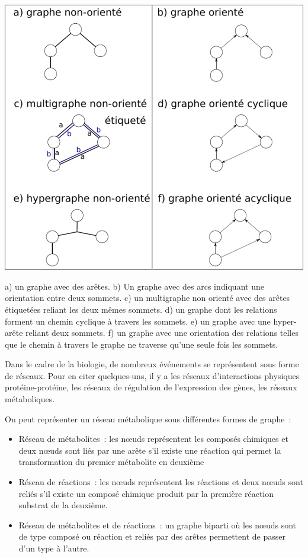 \begin{refsegment}
    
    \begin{shadedfigure}[H]
    	\centering
    	\includegraphics[width=\textwidth]{img/graph.pdf}
    	\caption{a) un graphe  avec des arêtes. b) Un graphe avec des arcs indiquant une orientation entre deux sommets. c) un multigraphe non orienté avec des arêtes étiquetées reliant les deux mêmes sommets. d) un graphe dont les relations forment un chemin cyclique à travers les sommets. e) un graphe avec une hyper-arête reliant deux sommets. f) un graphe avec une orientation des relations telles que le chemin à travers le graphe ne traverse qu'une seule fois les sommets. }
    	\label{fig:graphe}
    \end{shadedfigure}
    
    
    
    Dans le cadre de la biologie, de nombreux événements se représentent sous forme de réseaux. Pour en citer quelques-uns, il y a les réseaux d'interactions physiques protéine-protéine, les réseaux de régulation de l'expression des gènes, les réseaux  métaboliques. 
    
    On peut représenter un réseau métabolique sous différentes formes de graphe :
    \begin{itemize}
    	\item Réseau de métabolites : les nœuds représentent les composés chimiques et deux nœuds sont liés par une arête s'il existe une réaction qui permet la transformation du premier métabolite en deuxième
    	\item Réseau de réactions : les nœuds représentent les réactions et deux nœuds sont reliés s’il existe un composé chimique produit par la première réaction substrat de la deuxième.
    	\item Réseau de métabolites et de réactions : un graphe biparti où les nœuds sont de type composé ou réaction et reliés par des arêtes permettent de passer d’un type à l’autre.
    	

\end{itemize}
\end{refsegment}
